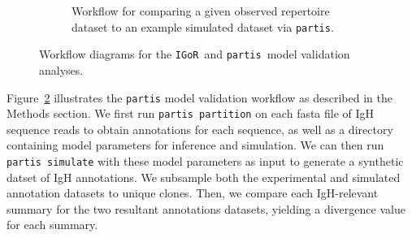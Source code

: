 \documentclass{article}
\newcommand{\partis}{\texttt{partis}}
\newcommand{\igor}{\texttt{IGoR}}
\begin{document}
\begin{figure}
\begin{subfigure}{0.5\textwidth}
\begin{adjustbox}{max totalsize={\textwidth}{.5\textheight},center}
    \end{adjustbox}
    \caption{Workflow for comparing a given observed repertoire dataset to an example simulated dataset via \texttt{partis}.}
    \label{fig:PartisWorkflow}
    \end{subfigure}
    \caption{Workflow diagrams for the \igor\ and \partis\ model validation analyses.}
\end{figure}
Figure~\ref{fig:PartisWorkflow} illustrates the \texttt{partis} model validation workflow as described in the Methods section.
We first run \texttt{partis partition} on each fasta file of IgH sequence reads to obtain annotations for each sequence, as well as a directory containing model parameters for inference and simulation.
We can then run \texttt{partis simulate} with these model parameters as input to generate a synthetic datset of IgH annotations.
We subsample both the experimental and simulated annotation datasets to unique clones.
Then, we compare each IgH-relevant summary for the two resultant annotations datasets, yielding a divergence value for each summary.
\end{document}
